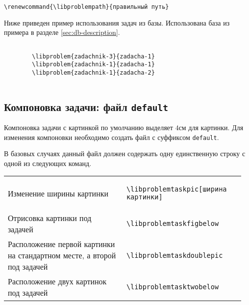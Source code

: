 \begin{lstlisting}[gobble = 3]
    \renewcommand{\libproblempath}{правильный путь}
\end{lstlisting}

Ниже приведен пример использования задач из базы. Использована база из примера в разделе
\ref{sec:db-description}.


\begin{lstlisting}[gobble = 3]
    
        \libproblem{zadachnik-3}{zadacha-1}
        \libproblem{zadachnik-1}{zadacha-1}
        \libproblem{zadachnik-1}{zadacha-2}
    
\end{lstlisting}




\subsection{Компоновка задачи: файл \texttt{default}}
\label{sec:db-default}

Компоновка задачи с картинкой по умолчанию выделяет $4\unit{см}$ для картинки. Для изменения компоновки
необходимо создать файл с суффиксом \texttt{default}.

В базовых случаях данный файл должен содержать одну единственную строку с одной из следующих команд.

\noindent
\begin{tabular}{S{0.48\linewidth} S{0.485\linewidth}}
    Изменение ширины картинки &
        \begin{lstlisting}[style = listtable, gobble = 10]
            \libproblemtaskpic[ширина картинки]
        \end{lstlisting} \\
    Отрисовка картинки под задачей &
        \begin{lstlisting}[style = listtable, gobble = 10]
            \libproblemtaskfigbelow
        \end{lstlisting} \\
    Расположение первой картинки на стандартном месте, а второй под задачей &
        \begin{lstlisting}[style = listtable, gobble = 10]
            \libproblemtaskdoublepic
        \end{lstlisting} \\
    Расположение двух картинок под задачей &
        \begin{lstlisting}[style = listtable, gobble = 10]
            \libproblemtasktwobelow
        \end{lstlisting}
\end{tabular}


